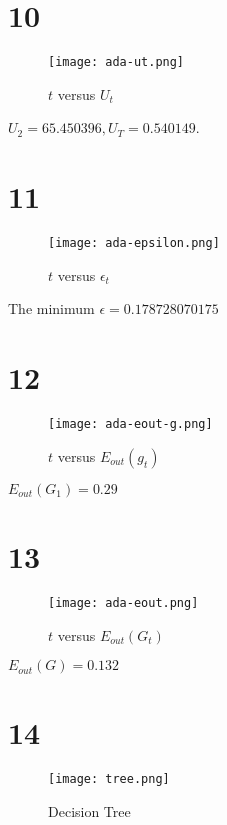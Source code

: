\documentclass[fleqn,a4paper,12pt]{article}
\begin{document}
\section*{10}

\begin{figure}[H]
\centering
\texttt{[image: ada-ut.png]}
\caption{$t$ versus $U_t$}
\label{fig:ada-ut}
\end{figure}

$U_2 = 65.450396, U_T = 0.540149$.

\section*{11}

\begin{figure}[H]
\centering
\texttt{[image: ada-epsilon.png]}
\caption{$t$ versus $\epsilon_t$}
\label{fig:ada-ut}
\end{figure}

The minimum $\epsilon = 0.178728070175$


\section*{12}

\begin{figure}[H]
\centering
\texttt{[image: ada-eout-g.png]}
\caption{$t$ versus $E_{out}(g_t)$}
\label{fig:ada-eout-g}
\end{figure}

$E_{out}(G_1) = 0.29$

\section*{13}

\begin{figure}[H]
\centering
\texttt{[image: ada-eout.png]}
\caption{$t$ versus $E_{out}(G_t)$}
\label{fig:ada-eout}
\end{figure}

$E_{out}(G) = 0.132$

\section*{14}

\begin{figure}[H]
\centering
\texttt{[image: tree.png]}
\caption{Decision Tree}
\label{fig:tree}
\end{figure}
\end{document}
